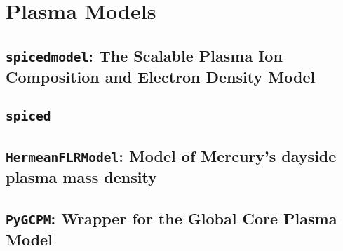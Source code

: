 \chapter{Plasma Models}

	\section{\texttt{spicedmodel}: The Scalable Plasma Ion Composition and Electron Density Model}

	\section{\texttt{spiced}}

	\section{\texttt{HermeanFLRModel}: Model of Mercury's dayside plasma mass density}

	\section{\texttt{PyGCPM}: Wrapper for the Global Core Plasma Model}
	